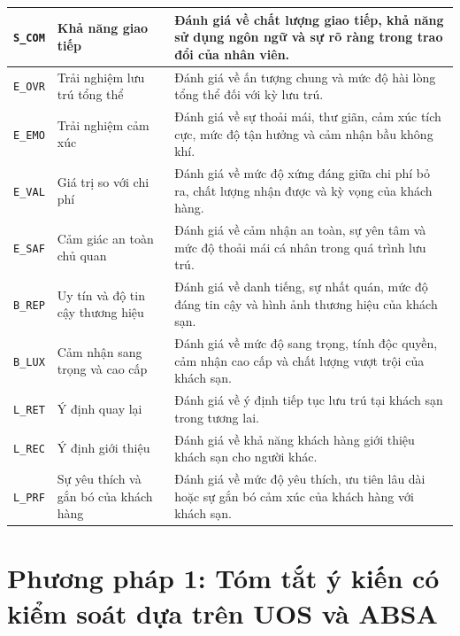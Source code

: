 {\begin{longtable}{@{}
    >{\centering\arraybackslash}p{1.5cm}
    >{\RaggedRight\arraybackslash}p{4.0cm}
    >{\RaggedRight\arraybackslash}p{10cm}
@{}}
\texttt{S\_COM}
&
Khả năng giao tiếp
&
Đánh giá về chất lượng giao tiếp, khả năng sử dụng ngôn ngữ và sự rõ ràng trong trao đổi của nhân viên. \\

\midrule

\texttt{E\_OVR}
&
Trải nghiệm lưu trú tổng thể
&
Đánh giá về ấn tượng chung và mức độ hài lòng tổng thể đối với kỳ lưu trú. \\

\texttt{E\_EMO}
&
Trải nghiệm cảm xúc
&
Đánh giá về sự thoải mái, thư giãn, cảm xúc tích cực, mức độ tận hưởng và cảm nhận bầu không khí. \\

\texttt{E\_VAL}
&
Giá trị so với chi phí
&
Đánh giá về mức độ xứng đáng giữa chi phí bỏ ra, chất lượng nhận được và kỳ vọng của khách hàng. \\

\texttt{E\_SAF}
&
Cảm giác an toàn chủ quan
&
Đánh giá về cảm nhận an toàn, sự yên tâm và mức độ thoải mái cá nhân trong quá trình lưu trú. \\

\midrule

\texttt{B\_REP}
&
Uy tín và độ tin cậy thương hiệu
&
Đánh giá về danh tiếng, sự nhất quán, mức độ đáng tin cậy và hình ảnh thương hiệu của khách sạn. \\

\texttt{B\_LUX}
&
Cảm nhận sang trọng và cao cấp
&
Đánh giá về mức độ sang trọng, tính độc quyền, cảm nhận cao cấp và chất lượng vượt trội của khách sạn. \\

\midrule

\texttt{L\_RET}
&
Ý định quay lại
&
Đánh giá về ý định tiếp tục lưu trú tại khách sạn trong tương lai. \\

\texttt{L\_REC}
&
Ý định giới thiệu
&
Đánh giá về khả năng khách hàng giới thiệu khách sạn cho người khác. \\

\texttt{L\_PRF}
&
Sự yêu thích và gắn bó của khách hàng
&
Đánh giá về mức độ yêu thích, ưu tiên lâu dài hoặc sự gắn bó cảm xúc của khách hàng với khách sạn. \\

\end{longtable}
}

\section{Phương pháp 1: Tóm tắt ý kiến có kiểm soát dựa trên UOS và ABSA}
\label{sec:method1-uasum}

